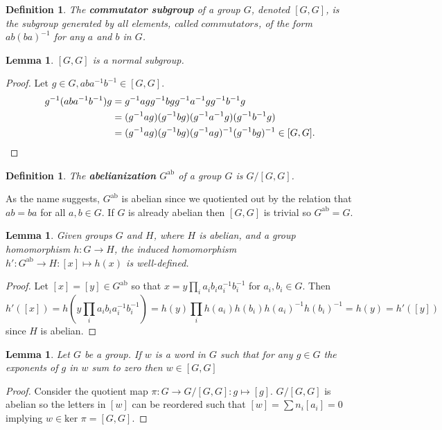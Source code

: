 \documentclass{article}
\newtheorem{definition}[theorem]{Definition}
\newtheorem{lemma}[theorem]{Lemma}
\begin{document}
\begin{definition}
The \textbf{commutator subgroup} of a group $G$, denoted $[G,G]$, is the subgroup generated by all elements, called $commutators$, of the form $ab(ba)^{-1}$ for any $a$ and $b$ in $G$.
\end{definition}

\begin{lemma}
$[G,G]$ is a normal subgroup.
\end{lemma}
\begin{proof}
Let $g\in G,aba^{-1}b^{-1}\in [G,G]$.\\
\begin{align*}
g^{-1}(aba^{-1}b^{-1})g&=g^{-1}agg^{-1}bgg^{-1}a^{-1}gg^{-1}b^{-1}g\\&=(g^{-1}ag)(g^{-1}bg)(g^{-1}a^{-1}g)(g^{-1}b^{-1}g)\\&=(g^{-1}ag)(g^{-1}bg)(g^{-1}ag)^{-1}(g^{-1}bg)^{-1}\in[G,G].\qedhere
\end{align*}
\end{proof}
\begin{definition}
The \textbf{abelianization} $G^{\text{ab}}$ of a group $G$ is $G/[G,G]$.
\end{definition}
\noindent As the name suggests, $G^{\text{ab}}$ is abelian since we quotiented out by the relation that $ab=ba$ for all $a,b\in G$. If $G$ is already abelian then $[G,G]$ is trivial so $G^{\text{ab}}=G$.

\begin{lemma}
Given groups $G$ and $H$, where $H$ is abelian, and a group homomorphism $h\colon G\to H$, the induced homomorphism $h'\colon G^{\text{ab}}\to H:[x]\mapsto h(x)$ is well-defined.
\end{lemma}
\begin{proof}
Let $[x]=[y]\in G^{\text{ab}}$ so that $x=y\prod_ia_ib_ia_i^{-1}b_i^{-1}$ for $a_i,b_i\in G$.
Then \[h'([x])=h(y\prod_ia_ib_ia_i^{-1}b_i^{-1})=h(y)\prod_ih(a_i)h(b_i)h(a_i)^{-1}h(b_i)^{-1}=h(y)=h'([y])\] since $H$ is abelian.
\end{proof}

\begin{lemma}
Let $G$ be a group. If $w$ is a word in $G$ such that for any $g\in G$ the exponents of $g$ in $w$ sum to zero then $w\in[G,G]$ 
\end{lemma}
\begin{proof}
Consider the quotient map $\pi\colon G\to G/[G,G]:g\mapsto[g]$.
$G/[G,G]$ is abelian so the letters in $[w]$ can be reordered such that $[w]=\sum n_i[a_i]=0$ implying $w\in\text{ker }\pi=[G,G]$. 
\end{proof}
\end{document}
